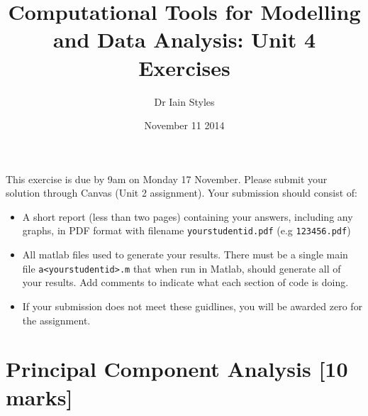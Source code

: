 \documentclass[12pt,a4paper]{tufte-handout}
\title{Computational Tools for Modelling and Data Analysis: Unit 4 Exercises}
\date{November 11 2014}
\author{Dr Iain Styles}
\begin{document}
\maketitle
This exercise is due by 9am on Monday 17 November. Please submit your solution 
through Canvas (Unit 2 assignment). Your submission should consist of:
\begin{itemize}
  \item A short report (less than two pages) containing your answers, including  any graphs, in PDF format with filename \texttt{yourstudentid.pdf} (e.g \texttt{123456.pdf})
  \item All matlab files used to generate your results. There must be a single main file \texttt{a<yourstudentid>.m} that when run in Matlab, should generate all of your results. Add comments to indicate what each section of code is doing.
  \item If your submission does not meet these guidlines, you will be awarded zero for the assignment.
\end{itemize}

\section{Principal Component Analysis [10 marks]}
\end{document}
